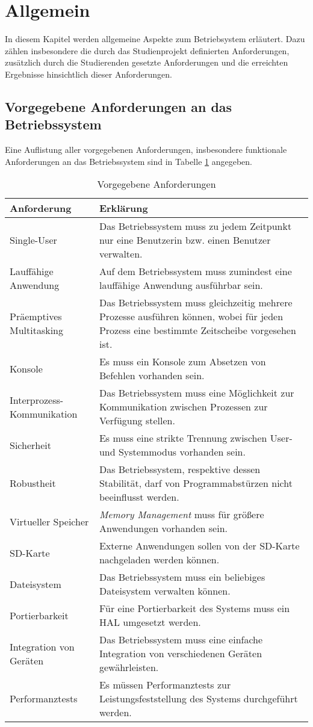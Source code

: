 \section{Allgemein}
In diesem Kapitel werden allgemeine Aspekte zum Betriebsystem erläutert. Dazu zählen insbesondere die durch das Studienprojekt definierten Anforderungen, zusätzlich durch die Studierenden gesetzte Anforderungen und die erreichten Ergebnisse hinsichtlich dieser Anforderungen.

\subsection{Vorgegebene Anforderungen an das Betriebssystem}
Eine Auflistung aller vorgegebenen Anforderungen, insbesondere funktionale Anforderungen an das Betriebssystem sind in Tabelle \ref{table:Prescribed-Requirements} angegeben.

\begin{table}[H]
\begin{tabular}{ p{5cm}| p{9cm} }
  \textbf{Anforderung} & \textbf{Erklärung} \\ 
  \hline
  Single-User & Das Betriebssystem muss zu jedem Zeitpunkt nur eine Benutzerin bzw. einen Benutzer verwalten. \\
  Lauffähige Anwendung & Auf dem Betriebssystem muss zumindest eine lauffähige Anwendung ausführbar sein. \\
  Präemptives Multitasking & Das Betriebssystem muss gleichzeitig mehrere Prozesse ausführen können, wobei für jeden Prozess eine bestimmte Zeitscheibe vorgesehen ist.\\
  Konsole & Es muss ein Konsole zum Absetzen von Befehlen vorhanden sein. \\
  Interprozess-Kommunikation & Das Betriebssystem muss eine Möglichkeit zur Kommunikation zwischen Prozessen zur Verfügung stellen. \\
  Sicherheit & Es muss eine strikte Trennung zwischen User- und Systemmodus vorhanden sein. \\
  Robustheit & Das Betriebssystem, respektive dessen Stabilität, darf von Programmabstürzen nicht beeinflusst werden. \\
  Virtueller Speicher & \textit{Memory Management} muss für größere Anwendungen vorhanden sein. \\
  SD-Karte & Externe Anwendungen sollen von der SD-Karte nachgeladen werden können. \\
  Dateisystem & Das Betriebssystem muss ein beliebiges Dateisystem verwalten können.\\
  Portierbarkeit & Für eine Portierbarkeit des Systems muss ein \ac{HAL} umgesetzt werden. \\
  Integration von Geräten & Das Betriebssystem muss eine einfache Integration von verschiedenen Geräten gewährleisten. \\
  Performanztests & Es müssen Performanztests zur Leistungsfeststellung des Systems durchgeführt werden. \\  
 \end{tabular}
 \caption{Vorgegebene Anforderungen}
 \label{table:Prescribed-Requirements}
\end{table}

